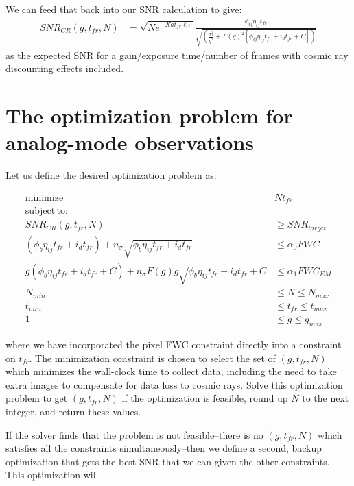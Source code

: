 \documentclass{article}
\begin{document}
We can feed that back into our SNR calculation to give:
\begin{align}
SNR_{CR}(g, t_{fr}, N) &= \sqrt{N e^{-Xat_{fr} \ell_{ij}}} \frac{\phi_{ij} \eta_{ij} t_{fr}}{\sqrt{\left(\frac{\sigma_{r}^2}{g^2} + F(g)^2  \left[\phi_{ij} \eta_{ij} t_{fr} + i_{d} t_{fr} + C\right]\right)}}
\end{align}
as the expected SNR for a gain/exposure time/number of frames with cosmic ray discounting effects included.

\section{The optimization problem for analog-mode observations}

\noindent Let us define the desired optimization problem as:

\begin{align}
\mathrm{minimize}\, & N t_{fr} \\
\mathrm{subject\,to:} & \nonumber \\
SNR_{CR}(g, t_{fr}, N) & \geq SNR_{target} \\
(\phi_{b} \eta_{ij} t_{fr} + i_{d} t_{fr}) + n_{\sigma} \sqrt{\phi_{b} \eta_{ij} t_{fr} + i_{d} t_{fr}} &\leq \alpha_{0} FWC \\
g(\phi_{b} \eta_{ij} t_{fr} + i_{d} t_{fr} + C) + n_{\sigma} F(g) g \sqrt{\phi_{b} \eta_{ij} t_{fr} + i_{d} t_{fr} + C} &\leq \alpha_{1} FWC_{EM} \\
N_{min} &\leq N \leq N_{max} \\
t_{min} &\leq t_{fr} \leq t_{max} \\
1 &\leq g \leq g_{max}
\end{align}

where we have incorporated the pixel FWC constraint directly into a constraint on $t_{fr}$.  The minimization constraint is chosen to select the set of $(g, t_{fr}, N)$ which minimizes the wall-clock time to collect data, including the need to take extra images to compensate for data loss to cosmic rays.  Solve this optimization problem to get $(g, t_{fr}, N)$ if the optimization is feasible, round up $N$ to the next integer, and return these values.

If the solver finds that the problem is not feasible--there is no $(g, t_{fr}, N)$ which satisfies all the constraints simultaneously--then we define a second, backup optimization that gets the best SNR that we can given the other constraints.  This optimization will
\end{document}
